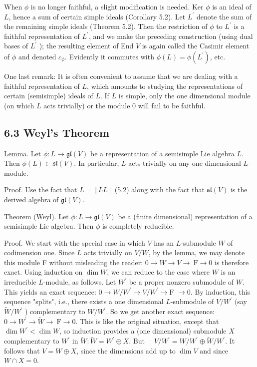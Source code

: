 \documentclass[10pt]{article}
\begin{document}
When $\phi$ is no longer faithful, a slight modification is needed. Ker $\phi$ is an ideal of $L$, hence a sum of certain simple ideals (Corollary 5.2). Let $L^{\prime}$ denote the sum of the remaining simple ideals (Theorem 5.2). Then the restriction of $\phi$ to $L^{\prime}$ is a faithful representation of $L^{\prime}$, and we make the preceding construction (using dual bases of $L^{\prime}$ ); the resulting element of End $V$ is again called the Casimir element of $\phi$ and denoted $c_{\phi}$. Evidently it commutes with $\phi(L)=\phi\left(L^{\prime}\right)$, etc.

One last remark: It is often convenient to assume that we are dealing with a faithful representation of $L$, which amounts to studying the representations of certain (semisimple) ideals of $L$. If $L$ is simple, only the one dimensional module (on which $L$ acts trivially) or the module 0 will fail to be faithful.

\subsection*{6.3 Weyl's Theorem}
Lemma. Let $\phi: L \rightarrow \mathfrak{g l}(V)$ be a representation of a semisimple Lie algebra $L$. Then $\phi(L) \subset \mathfrak{s l}(V)$. In particular, $L$ acts trivially on any one dimensional $L$-module.

Proof. Use the fact that $L=[L L]$ (5.2) along with the fact that $\mathfrak{s l}(V)$ is the derived algebra of $\mathfrak{g l}(V)$.

Theorem (Weyl). Let $\phi: L \rightarrow \mathfrak{g l}(V)$ be a (finite dimensional) representation of a semisimple Lie algebra. Then $\phi$ is completely reducible.

Proof. We start with the special case in which $V$ has an $L$-submodule $W$ of codimension one. Since $L$ acts trivially on $V / W$, by the lemma, we may denote this module F without misleading the reader: $0 \rightarrow W \rightarrow V \rightarrow \mathrm{~F} \rightarrow 0$ is therefore exact. Using induction on $\operatorname{dim} W$, we can reduce to the case where $W$ is an irreducible $L$-module, as follows. Let $W^{\prime}$ be a proper nonzero submodule of $W$. This yields an exact sequence: $0 \rightarrow W / W^{\prime} \rightarrow V / W^{\prime} \rightarrow \mathrm{F}$ $\rightarrow 0$. By induction, this sequence "splits", i.e., there exists a one dimensional $L$-submodule of $V / W^{\prime}$ (say $\tilde{W} / W^{\prime}$ ) complementary to $W / W^{\prime}$. So we get another exact sequence: $0 \rightarrow W^{\prime} \rightarrow \widetilde{W} \rightarrow \mathrm{~F} \rightarrow 0$. This is like the original situation, except that $\operatorname{dim} W^{\prime}<\operatorname{dim} W$, so induction provides a (one dimensional) submodule $X$ complementary to $W^{\prime}$ in $\tilde{W}: \tilde{W}=W^{\prime} \oplus X$. But $\quad V / W^{\prime}=W / W^{\prime} \oplus \tilde{W} / W^{\prime}$. It follows that $V=W \oplus X$, since the dimensions add up to $\operatorname{dim} V$ and since $W \cap X=0$.
\end{document}
